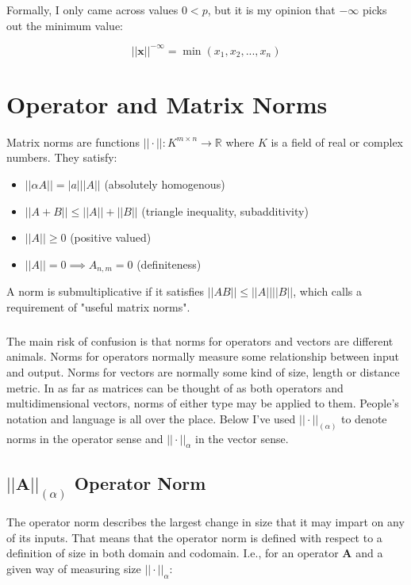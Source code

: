 Formally, I only came across values $0<p$, but it is my opinion that $-\infty$ picks out the minimum value:

\begin{equation}
||\mathbf{x}||^{-\infty} = \min(x_1,x_2,...,x_n)
\end{equation}




\section{Operator and Matrix Norms}

Matrix norms are functions $||\cdot||: K^{m\times n} \rightarrow \mathbb{R}$ where $K$ is a field of real or complex numbers. They satisfy:

\begin{itemize}
\item $||\alpha A|| = |a| ||A||$ (absolutely homogenous)
\item $||A+B|| \leq ||A|| + ||B||$ (triangle inequality, subadditivity)
\item $||A||\geq 0$ (positive valued)
\item $||A||=0 \implies A_{n,m}=0$ (definiteness)
\end{itemize}

A norm is submultiplicative if it satisfies $||AB||\leq||A||||B||$, which  calls a requirement of "useful matrix norms".

\subparagraph{} 
The main risk of confusion is that norms for operators and vectors are different animals. Norms for operators normally measure some relationship between input and output. Norms for vectors are normally some kind of size, length or distance metric. In as far as matrices can be thought of as both operators and multidimensional vectors, norms of either type may be applied to them. People's notation and language is all over the place. Below I've used $||\cdot||_{(\alpha)}$ to denote norms in the operator sense and $||\cdot||_{\alpha}$ in the vector sense. 

\subsection{$||\mathbf{A}||_{(\alpha)}$ Operator Norm}
The operator norm describes the largest change in size that it may impart on any of its inputs. That means that the operator norm is defined with respect to a definition of size in both domain and codomain. I.e., for an operator $\mathbf{A}$ and a given way of measuring size $||\cdot||_{\alpha}$:

